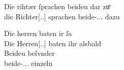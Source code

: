 \begin{exe}
\ex \label{ex:richtherriu2}
	\begin{xlist}
	\ex \label{ex:richtherriu2_1}
		\gll Die rihtær ſprachen beideu {dar zuͦ} \\
			die Richter[\Nom.\Pl.\MascM] sprachen beide-\Nom.\Pl.\NeutM.\St{}
			dazu \\
		\begin{taggedline}{\parencites[\pno~28ra,8]{kc:B1}[vgl.~abweichend][10090]{schroeder1895}} %
		\trans {}
		\end{taggedline}

	\ex \label{ex:richtherriu2_2}
		\gll Die herren baten ir ſa \\
			Die Herren[\Nom.\Pl.\MascM] baten ihr alsbald \\
	\sn \gll Beideu beſvnder \\
			beide-\Nom.\Pl.\NeutM.\St{} einzeln \\
		\begin{taggedline}{\parencites[\pno~31va,48--49]{kc:B1}[vgl.][11385--11386]{schroeder1895}} %
		\trans {}
		\end{taggedline}
	\end{xlist}
\end{exe}



